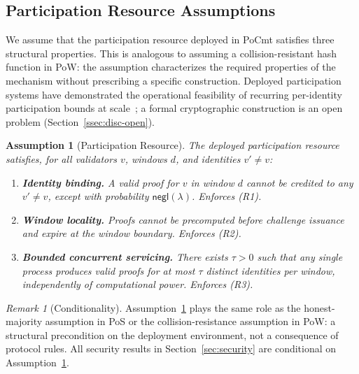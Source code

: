\documentclass[10pt,journal,twoside]{IEEEtran}
\newtheorem{assumption}[theorem]{Assumption}
\theoremstyle{remark}
\newtheorem{remark}{Remark}[section]
\newcommand{\negl}{\mathsf{negl}}
\begin{document}
	\subsection{Participation Resource Assumptions}
	\label{ssec:po}
	
	We assume that the participation resource deployed in
	PoCmt satisfies three structural properties.
	This is analogous to assuming a collision-resistant hash
	function in PoW: the assumption characterizes the
	required properties of the mechanism without prescribing
	a specific construction.
	Deployed participation systems have demonstrated the
	operational feasibility of recurring per-identity
	participation bounds at scale~\cite{pinetwork2019};
	a formal cryptographic construction is an open
	problem (Section~\ref{ssec:disc-open}).
	
	\begin{assumption}[Participation Resource]
		\label{asm:po}
		The deployed participation resource satisfies,
		for all validators $v$, windows $d$, and
		identities $v' \neq v$:
		\begin{enumerate}
			\item[\textbf{(A1)}] \textbf{Identity binding.}
			A valid proof for $v$ in window $d$ cannot be
			credited to any $v' \neq v$, except with
			probability $\negl(\lambda)$.
			Enforces (R1).
			
			\item[\textbf{(A2)}] \textbf{Window locality.}
			Proofs cannot be precomputed before challenge
			issuance and expire at the window boundary.
			Enforces (R2).
			
			\item[\textbf{(A3)}] \textbf{Bounded concurrent
				servicing.}
			There exists $\tau > 0$ such that any single
			process produces valid proofs for at most $\tau$
			distinct identities per window, independently of
			computational power.
			Enforces (R3).
		\end{enumerate}
	\end{assumption}
	
	\begin{remark}[Conditionality]
		\label{rem:po-assumption}
		Assumption~\ref{asm:po} plays the same role as the
		honest-majority assumption in PoS or the
		collision-resistance assumption in PoW: a structural
		precondition on the deployment environment, not a
		consequence of protocol rules.
		All security results in Section~\ref{sec:security}
		are conditional on Assumption~\ref{asm:po}.
	\end{remark}
	
\end{document}
